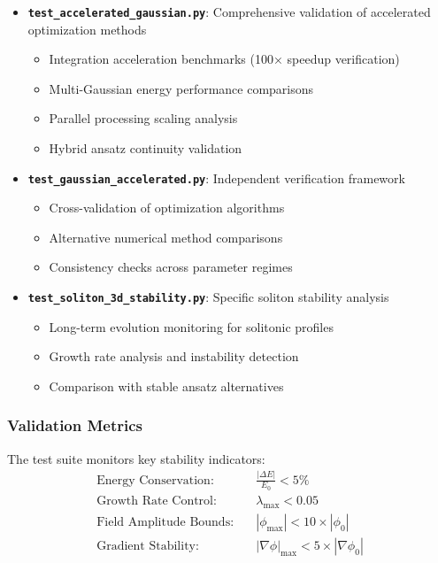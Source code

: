 \documentclass[11pt,a4paper]{article}
\begin{document}
\begin{itemize}
\item \textbf{\texttt{test\_accelerated\_gaussian.py}}: Comprehensive validation of accelerated optimization methods
  \begin{itemize}
  \item Integration acceleration benchmarks (100× speedup verification)
  \item Multi-Gaussian energy performance comparisons
  \item Parallel processing scaling analysis
  \item Hybrid ansatz continuity validation
  \end{itemize}

\item \textbf{\texttt{test\_gaussian\_accelerated.py}}: Independent verification framework
  \begin{itemize}
  \item Cross-validation of optimization algorithms
  \item Alternative numerical method comparisons
  \item Consistency checks across parameter regimes
  \end{itemize}

\item \textbf{\texttt{test\_soliton\_3d\_stability.py}}: Specific soliton stability analysis
  \begin{itemize}
  \item Long-term evolution monitoring for solitonic profiles
  \item Growth rate analysis and instability detection
  \item Comparison with stable ansatz alternatives
  \end{itemize}
\end{itemize}

\subsubsection{Validation Metrics}

The test suite monitors key stability indicators:
\begin{align}
\text{Energy Conservation:} \quad &\frac{|\Delta E|}{E_0} < 5\% \\
\text{Growth Rate Control:} \quad &\lambda_{\max} < 0.05 \\
\text{Field Amplitude Bounds:} \quad &|\phi_{\max}| < 10 \times |\phi_0| \\
\text{Gradient Stability:} \quad &|\nabla\phi|_{\max} < 5 \times |\nabla\phi_0|
\end{align}
\end{document}
